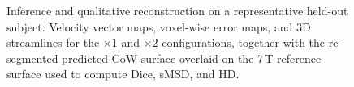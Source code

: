 \begin{figure}[!htbp]
    \centering
    \caption{Inference and qualitative reconstruction on a
    representative held-out subject. Velocity vector maps, voxel-wise
    error maps, and 3D streamlines for the $\times 1$ and $\times 2$
    configurations, together with the re-segmented predicted CoW
    surface overlaid on the 7\,T reference surface used to compute
    Dice, sMSD, and HD.}
    \label{fig:inference}
\end{figure}

